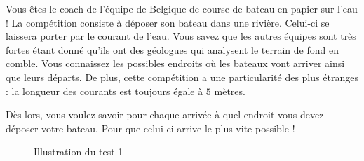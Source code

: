 \problemname{\problemyamlname}


\newcommand{\maxn}{}

Vous êtes le coach de l'équipe de Belgique de course de bateau en papier sur l'eau ! La compétition consiste à déposer son bateau dans une rivière. Celui-ci se laissera porter par le courant de l'eau.
Vous savez que les autres équipes sont très fortes étant donné qu'ils ont des géologues qui analysent le terrain de fond en comble. Vous connaissez les possibles endroits où les bateaux vont arriver ainsi que leurs départs.
De plus, cette compétition a une particularité des plus étranges : la longueur des courants est toujours égale à $5$ mètres.

Dès lors, vous voulez savoir pour chaque arrivée à quel endroit vous devez déposer votre bateau. Pour que celui-ci arrive le plus vite possible !

\begin{figure}[h]
    \begin{center}
    \end{center}
    \caption{Illustration du test 1}
\end{figure}

